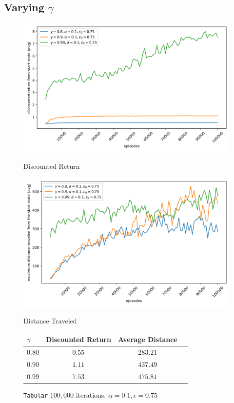 \subsection{Varying $\gamma$}
\begin{figure}[H]
    \centering
    \begin{minipage}{0.49\linewidth}
        \centering
        \includegraphics[width=\linewidth]{plots/part1-b-rewards.png}
        \caption{Discounted Return}
    \end{minipage}
    \hfill
    \begin{minipage}{0.49\linewidth}
        \centering
        \includegraphics[width=\linewidth]{plots/part1-b-distances.png}
        \caption{Distance Traveled}
    \end{minipage}

    \vspace{1em}
    \begin{minipage}{\linewidth}
        \centering
        \begin{tabular}{lccc}
            \hline
            $\gamma$ & Discounted Return & Average Distance \\
            \hline
            $0.80$ & $0.55$ & $283.21$ \\
            $0.90$ & $1.11$ & $437.49$ \\
            $0.99$ & $7.53$ & $475.81$ \\
            \hline
        \end{tabular}
        \caption{\texttt{Tabular} $100,000$ iterations, $\alpha = 0.1, \epsilon = 0.75$}
    \end{minipage}
     \label{fig:part1-b}
\end{figure}
